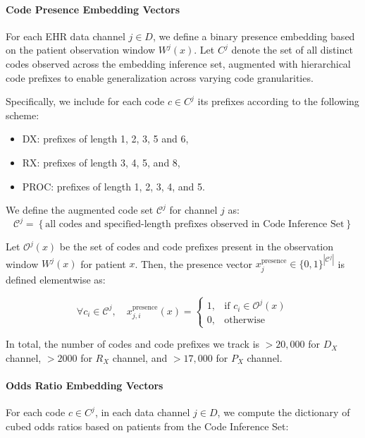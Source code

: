 \documentclass[onecolumn, compsoc,11pt]{IEEEtran}
\begin{document}
\paragraph*{Code Presence Embedding Vectors}
For each EHR data channel $j \in D$, we define a binary presence embedding based on the patient observation window $W^j(x)$. Let $C^j$ denote the set of all distinct codes observed across the embedding inference set, augmented with hierarchical code prefixes to enable generalization across varying code granularities.

Specifically, we include for each code $c \in C^j$ its prefixes according to the following scheme:
\begin{itemize}
    \item DX: prefixes of length 1, 2, 3, 5 and 6,
    \item RX: prefixes of length 3, 4, 5, and 8,
    \item PROC: prefixes of length 1, 2, 3, 4, and 5.
\end{itemize}

We define the augmented code set $\mathcal{C}^j$ for channel $j$ as:
\[
\mathcal{C}^j = \left\{ \text{all codes and specified-length prefixes observed in Code Inference Set} \right\}
\]

Let $\mathcal{O}^j(x)$ be the set of codes and code prefixes present in the observation window $W^j(x)$ for patient $x$. Then, the presence vector $x^{\text{presence}}_j \in \{0, 1\}^{|\mathcal{C}^j|}$ is defined elementwise as:

\begin{equation}
\forall c_i \in \mathcal{C}^j, \quad x^{\text{presence}}_{j,i}(x) =
\begin{cases}
1, & \text{if } c_i \in \mathcal{O}^j(x) \\
0, & \text{otherwise}
\end{cases}
\end{equation}

In total, the number of codes and code prefixes we track is $>20,000$ for $D_X$ channel, $>2000$ for $R_X$ channel, and $>17,000$ for $P_X$ channel. 


\paragraph*{Odds Ratio Embedding Vectors}

For each code $c \in C^j$, in each data channel $j \in D$, we compute the dictionary of cubed odds ratios based on patients from the Code Inference Set:
\end{document}
